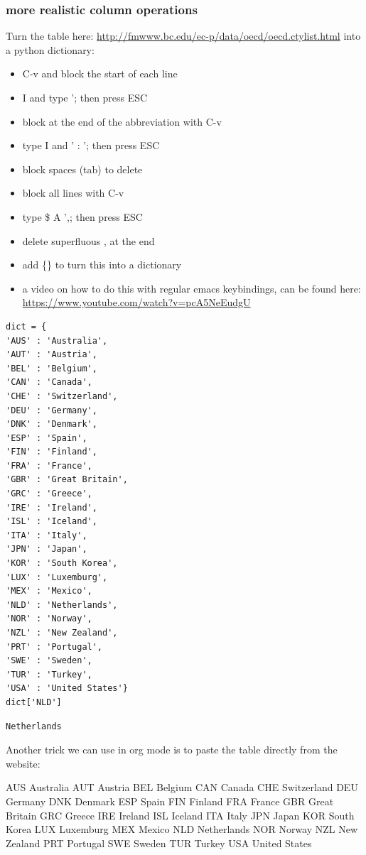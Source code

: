 \documentclass[11pt]{article}
\begin{document}
\subsubsection{more realistic column operations}

Turn the table here: \url{http://fmwww.bc.edu/ec-p/data/oecd/oecd.ctylist.html} into a python dictionary:
\begin{itemize}
\item C-v and block the start of each line
\item I and type '; then press ESC
\item block at the end of the abbreviation with C-v
\item type I and ' : '; then press ESC
\item block spaces (tab) to delete
\item block all lines with C-v
\item type \$ A ',; then press ESC
\item delete superfluous , at the end
\item add \{\} to turn this into a dictionary
\item a video on how to do this with regular emacs keybindings, can be found here: \url{https://www.youtube.com/watch?v=pcA5NeEudgU}
\end{itemize}

\begin{verbatim}
dict = {
'AUS' : 'Australia',
'AUT' : 'Austria',
'BEL' : 'Belgium',
'CAN' : 'Canada',
'CHE' : 'Switzerland',
'DEU' : 'Germany',
'DNK' : 'Denmark',
'ESP' : 'Spain',
'FIN' : 'Finland',
'FRA' : 'France',
'GBR' : 'Great Britain',
'GRC' : 'Greece',
'IRE' : 'Ireland',
'ISL' : 'Iceland',
'ITA' : 'Italy',
'JPN' : 'Japan',
'KOR' : 'South Korea',
'LUX' : 'Luxemburg',
'MEX' : 'Mexico',
'NLD' : 'Netherlands',
'NOR' : 'Norway',
'NZL' : 'New Zealand',
'PRT' : 'Portugal',
'SWE' : 'Sweden',
'TUR' : 'Turkey',
'USA' : 'United States'}
dict['NLD']
\end{verbatim}

\begin{verbatim}
Netherlands
\end{verbatim}


Another trick we can use in org mode is to paste the table directly from the website:

AUS 	Australia
AUT 	Austria
BEL 	Belgium
CAN 	Canada
CHE 	Switzerland
DEU 	Germany
DNK 	Denmark
ESP 	Spain
FIN 	Finland
FRA 	France
GBR 	Great Britain
GRC 	Greece
IRE 	Ireland
ISL 	Iceland
ITA 	Italy
JPN 	Japan
KOR 	South Korea
LUX 	Luxemburg
MEX 	Mexico
NLD 	Netherlands
NOR 	Norway
NZL 	New Zealand
PRT 	Portugal
SWE 	Sweden
TUR 	Turkey
USA 	United States
\end{document}
